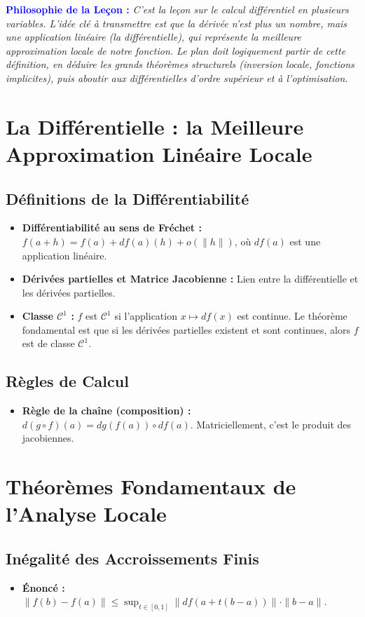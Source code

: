 \documentclass[12pt, a4paper, parskip=full]{report}
\theoremstyle{agregstyle}
\newenvironment{philosophie}
  {\par\medskip\noindent\begin{oframed}\noindent\textbf{\textcolor{blue}{Philosophie de la Leçon :}}\itshape}
  {\end{oframed}\par\medskip}
\begin{document}
\begin{philosophie}
    C'est la leçon sur le calcul différentiel en plusieurs variables. L'idée clé à transmettre est que la dérivée n'est plus un nombre, mais une application linéaire (la différentielle), qui représente la meilleure approximation locale de notre fonction. Le plan doit logiquement partir de cette définition, en déduire les grands théorèmes structurels (inversion locale, fonctions implicites), puis aboutir aux différentielles d'ordre supérieur et à l'optimisation.
\end{philosophie}

\section{La Différentielle : la Meilleure Approximation Linéaire Locale}
\subsection{Définitions de la Différentiabilité}
\begin{itemize}
    \item \textbf{Différentiabilité au sens de Fréchet :} $f(a+h) = f(a) + df(a)(h) + o(\|h\|)$, où $df(a)$ est une application linéaire.
    \item \textbf{Dérivées partielles et Matrice Jacobienne :} Lien entre la différentielle et les dérivées partielles.
    \item \textbf{Classe $\mathcal{C}^1$ :} $f$ est $\mathcal{C}^1$ si l'application $x \mapsto df(x)$ est continue. Le théorème fondamental est que si les dérivées partielles existent et sont continues, alors $f$ est de classe $\mathcal{C}^1$.
\end{itemize}

\subsection{Règles de Calcul}
\begin{itemize}
    \item \textbf{Règle de la chaîne (composition) :} $d(g \circ f)(a) = dg(f(a)) \circ df(a)$. Matriciellement, c'est le produit des jacobiennes.
\end{itemize}

\section{Théorèmes Fondamentaux de l'Analyse Locale}
\subsection{Inégalité des Accroissements Finis}
\begin{itemize}
    \item \textbf{Énoncé :} $\|f(b)-f(a)\| \le \sup_{t \in [0,1]} \|df(a+t(b-a))\| \cdot \|b-a\|$.
\end{itemize}
\end{document}
